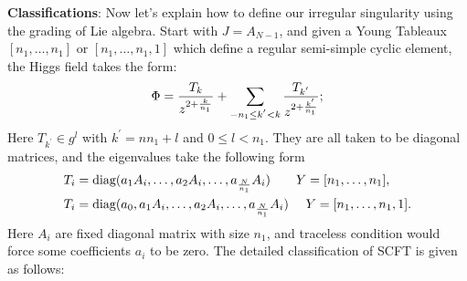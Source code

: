 \documentclass[a4paper,11pt]{article}
\begin{document}
\textbf{Classifications}: Now let's explain how to define our irregular singularity using the grading of Lie algebra. 
Start with $J=A_{N-1}$, and given a Young Tableaux $[n_1,\ldots, n_1]$ or $[n_1, \ldots, n_1,1]$ which define a regular semi-simple cyclic element,   the Higgs field takes the form:
\begin{equation}
\Phi={T_k\over z^{2+{k\over n_1}}}+\sum_{-{n_1}\leq k^{'}<k} {T_{k^{'}}\over z^{2+{k^{'}\over n_1}}};
\end{equation}
Here $T_{k^{'}} \in g^l$ with $k^{'}=n n_1+l$ and $ 0 \leq l< n_1$.  
They are all taken to be diagonal matrices, and the eigenvalues take the following form
\begin{align}
& T_i=\text{diag}(a_1 A_i,\ldots, a_2 A_i,\ldots, a_{{N\over n_1}} A_i)~~~~~~Y=[n_1,\ldots, n_1] ,\nonumber\\
&T_i=\text{diag}(a_0, a_1 A_i,\ldots, a_2 A_i,\ldots, a_{{N\over n_1}} A_i)~~~~Y=[n_1,\ldots, n_1,1].
\label{degen}
\end{align}
Here $A_i$ are fixed diagonal  matrix with size $n_1$, and traceless condition would force some coefficients $a_i$ to be zero.  
The detailed classification of SCFT is given as follows:
\end{document}
